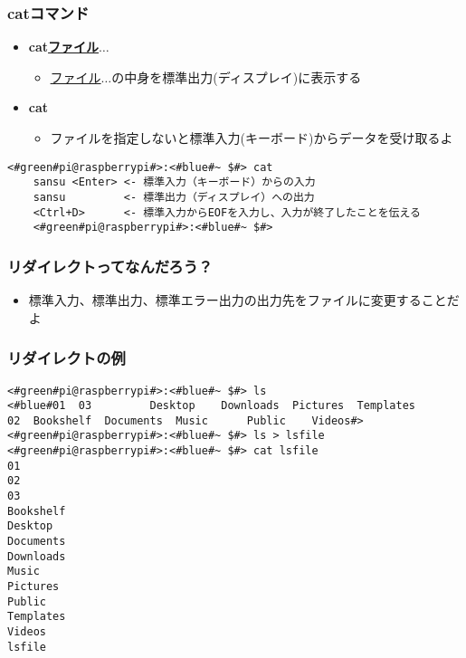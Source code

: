 \begin{frame}[fragile]
    \frametitle{catコマンド}
    \begin{itemize}
        \item {\bf cat\textvisiblespace\underline{ファイル}$\ldots$}
        \begin{itemize}
            \small
            \item[] \underline{ファイル}$\ldots$の中身を標準出力(ディスプレイ)に表示する
        \end{itemize}
        \item {\bf cat}
        \begin{itemize}
            \small
            \item[] ファイルを指定しないと標準入力(キーボード)からデータを受け取るよ
        \end{itemize}
    \end{itemize}
    \begin{lstlisting}[title=catの標準入力・標準出力, label=stdioCat]
    <#green#pi@raspberrypi#>:<#blue#~ $#> cat 
    sansu <Enter> <- 標準入力（キーボード）からの入力
    sansu         <- 標準出力（ディスプレイ）への出力
    <Ctrl+D>      <- 標準入力からEOFを入力し、入力が終了したことを伝える
    <#green#pi@raspberrypi#>:<#blue#~ $#>
    \end{lstlisting}
\end{frame}

\begin{frame}
    \frametitle{リダイレクトってなんだろう？}
    \begin{itemize}
        \item 標準入力、標準出力、標準エラー出力の出力先をファイルに変更することだよ
    \end{itemize}
    \begin{figure}
        \centering
        
    \end{figure}
\end{frame}

\begin{frame}[fragile]
    \frametitle{リダイレクトの例}
    \begin{lstlisting}[title=lsの出力をリダイレクトする, label=redirectLs]
<#green#pi@raspberrypi#>:<#blue#~ $#> ls 
<#blue#01  03         Desktop    Downloads  Pictures  Templates
02  Bookshelf  Documents  Music      Public    Videos#>
<#green#pi@raspberrypi#>:<#blue#~ $#> ls > lsfile
<#green#pi@raspberrypi#>:<#blue#~ $#> cat lsfile
01
02
03
Bookshelf
Desktop
Documents
Downloads
Music
Pictures
Public
Templates
Videos
lsfile
    \end{lstlisting}
\end{frame}

